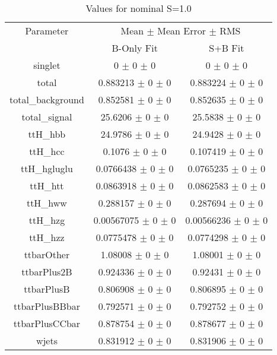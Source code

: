 \begin{table}
\centering
\caption{Values for nominal S=1.0}
\begin{tabular}{ccc}
\toprule
Parameter 	& \multicolumn{2}{c}{Mean $\pm$ Mean Error $\pm$ RMS}\\
 	& B-Only Fit & S+B Fit\\
\midrule
singlet 	& \num{0} $\pm$ \num{0} $\pm$ \num{0} 	& \num{0} $\pm$ \num{0} $\pm$ \num{0}\\
total 	& \num{0.883213} $\pm$ \num{0} $\pm$ \num{0} 	& \num{0.883224} $\pm$ \num{0} $\pm$ \num{0}\\
total\_background 	& \num{0.852581} $\pm$ \num{0} $\pm$ \num{0} 	& \num{0.852635} $\pm$ \num{0} $\pm$ \num{0}\\
total\_signal 	& \num{25.6206} $\pm$ \num{0} $\pm$ \num{0} 	& \num{25.5838} $\pm$ \num{0} $\pm$ \num{0}\\
ttH\_hbb 	& \num{24.9786} $\pm$ \num{0} $\pm$ \num{0} 	& \num{24.9428} $\pm$ \num{0} $\pm$ \num{0}\\
ttH\_hcc 	& \num{0.1076} $\pm$ \num{0} $\pm$ \num{0} 	& \num{0.107419} $\pm$ \num{0} $\pm$ \num{0}\\
ttH\_hgluglu 	& \num{0.0766438} $\pm$ \num{0} $\pm$ \num{0} 	& \num{0.0765235} $\pm$ \num{0} $\pm$ \num{0}\\
ttH\_htt 	& \num{0.0863918} $\pm$ \num{0} $\pm$ \num{0} 	& \num{0.0862583} $\pm$ \num{0} $\pm$ \num{0}\\
ttH\_hww 	& \num{0.288157} $\pm$ \num{0} $\pm$ \num{0} 	& \num{0.287694} $\pm$ \num{0} $\pm$ \num{0}\\
ttH\_hzg 	& \num{0.00567075} $\pm$ \num{0} $\pm$ \num{0} 	& \num{0.00566236} $\pm$ \num{0} $\pm$ \num{0}\\
ttH\_hzz 	& \num{0.0775478} $\pm$ \num{0} $\pm$ \num{0} 	& \num{0.0774298} $\pm$ \num{0} $\pm$ \num{0}\\
ttbarOther 	& \num{1.08008} $\pm$ \num{0} $\pm$ \num{0} 	& \num{1.08001} $\pm$ \num{0} $\pm$ \num{0}\\
ttbarPlus2B 	& \num{0.924336} $\pm$ \num{0} $\pm$ \num{0} 	& \num{0.92431} $\pm$ \num{0} $\pm$ \num{0}\\
ttbarPlusB 	& \num{0.806908} $\pm$ \num{0} $\pm$ \num{0} 	& \num{0.806895} $\pm$ \num{0} $\pm$ \num{0}\\
ttbarPlusBBbar 	& \num{0.792571} $\pm$ \num{0} $\pm$ \num{0} 	& \num{0.792752} $\pm$ \num{0} $\pm$ \num{0}\\
ttbarPlusCCbar 	& \num{0.878754} $\pm$ \num{0} $\pm$ \num{0} 	& \num{0.878677} $\pm$ \num{0} $\pm$ \num{0}\\
wjets 	& \num{0.831912} $\pm$ \num{0} $\pm$ \num{0} 	& \num{0.831906} $\pm$ \num{0} $\pm$ \num{0}\\
\bottomrule
\end{tabular}
\end{table}